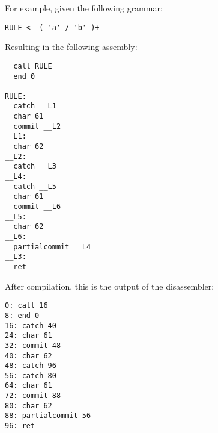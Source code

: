 For example, given the following grammar:

\begin{myquote}
\begin{verbatim}
RULE <- ( 'a' / 'b' )+
\end{verbatim}
\end{myquote}

Resulting in the following assembly:

\begin{myquote}
\begin{verbatim}
  call RULE
  end 0

RULE:
  catch __L1
  char 61
  commit __L2
__L1:
  char 62
__L2:
  catch __L3
__L4:
  catch __L5
  char 61
  commit __L6
__L5:
  char 62
__L6:
  partialcommit __L4
__L3:
  ret
\end{verbatim}
\end{myquote}

After compilation, this is the output of the disassembler:

\begin{myquote}
\begin{verbatim}
0: call 16
8: end 0
16: catch 40
24: char 61
32: commit 48
40: char 62
48: catch 96
56: catch 80
64: char 61
72: commit 88
80: char 62
88: partialcommit 56
96: ret
\end{verbatim}
\end{myquote}

